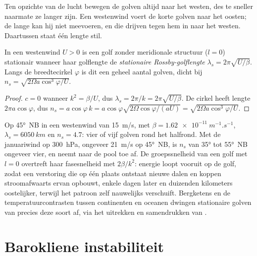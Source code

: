 Ten opzichte van de lucht bewegen de golven altijd naar het westen, des te sneller naarmate
ze langer zijn. Een westenwind voert de korte golven naar het oosten; de lange
kan hij niet meevoeren, en die drijven tegen hem in naar het westen. Daartussen
staat één lengte stil.

\begin{proposition}\label{prop:b3:atmospheric-dynamics:stationary}
In een westenwind $U > 0$ is een golf zonder meridionale structuur ($l = 0$)
stationair wanneer haar golflengte de
\emph{stationaire Rossby-golflengte} $\lambda_s =
2\pi\sqrt{U/\beta}$. Langs de breedtecirkel $\varphi$ is dit een geheel
aantal golven, dicht bij $n_s = \sqrt{2\Omega a\cos^3\varphi/U}$.
\end{proposition}

\begin{proof}
$c = 0$ wanneer $k^2 = \beta/U$, dus $\lambda_s = 2\pi/k = 2\pi\sqrt{U/\beta}$.
De cirkel heeft lengte $2\pi a\cos\varphi$, dus $n_s = a\cos\varphi\,k =
a\cos\varphi\sqrt{2\Omega\cos\varphi/(aU)} = \sqrt{2\Omega a\cos^3\varphi/U}$.
\end{proof}

Op \ang{45}~NB in een westenwind van \qty{15}{m/s}, met $\beta =
\qty{1.62e-11}{m^{-1}.s^{-1}}$, $\lambda_s = \qty{6050}{km}$ en $n_s =
4.7$: vier of vijf golven rond het halfrond. Met de 
januariwind op \qty{300}{hPa}, ongeveer \qty{21}{m/s} op \ang{45}~NB, is $n_s$
van \ang{35} tot \ang{55}~NB ongeveer vier, en neemt naar de pool toe af. De groepssnelheid
van een golf met $l = 0$ overtreft haar fasesnelheid met $2\beta/k^2$: energie loopt
vooruit op de golf, zodat een verstoring die op één plaats ontstaat nieuwe dalen
en koppen stroomafwaarts ervan opbouwt, enkele dagen later en duizenden kilometers
oostelijker, terwijl het patroon zelf nauwelijks verschuift. Bergketens en de
temperatuurcontrasten tussen continenten en oceanen dwingen stationaire golven
van precies deze soort af, via het uitrekken en samendrukken van
.


\section{Barokliene instabiliteit}\label{sec:b3:atmospheric-dynamics:baroclinic}

